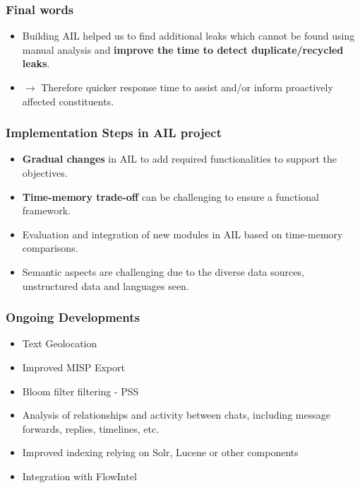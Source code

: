 \documentclass[aspectratio=169]{beamer}
\begin{document}
\begin{frame}
   \frametitle{Final words}
   \begin{itemize}
        \item Building AIL helped us to find additional leaks which cannot be found using manual analysis and {\bf improve the time to detect duplicate/recycled leaks}.
            \vskip0.5cm
        \item[] $\rightarrow$ Therefore quicker response time to assist and/or inform proactively affected constituents.
   \end{itemize}
\end{frame}

\begin{frame}
    \frametitle{Implementation Steps in AIL project}
    \begin{itemize}
            \item {\bf Gradual changes} in AIL to add required functionalities to support the objectives.
            \item {\bf Time-memory trade-off} can be challenging to ensure a functional framework.
            \item Evaluation and integration of new modules in AIL based on time-memory comparisons.
            \item Semantic aspects are challenging due to the diverse data sources, unstructured data and languages seen.
    \end{itemize}
\end{frame}



\begin{frame}
    \frametitle{Ongoing Developments}
        \begin{itemize}
            \item Text Geolocation
            \item Improved MISP Export
            \item Bloom filter filtering - PSS
            \item Analysis of relationships and activity between chats, including message forwards, replies, timelines, etc.
            \item Improved indexing relying on Solr, Lucene or other components
            \item Integration with FlowIntel
        \end{itemize}
\end{frame}
\end{document}
